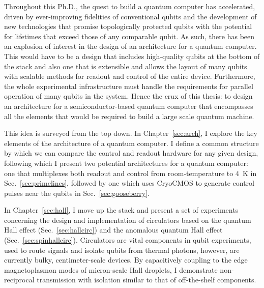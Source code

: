 %
%
%
Throughout this Ph.D., the quest to build a quantum computer has accelerated, driven by ever-improving fidelities of conventional qubits and the development of new technologies
that promise topologically protected qubits with the potential for lifetimes that exceed those of any comparable
qubit. As such, there has been an explosion of interest in the design of an architecture for a
quantum computer. This would have to be a design that includes high-quality qubits at the bottom of the stack
and also one that is extensible and allows the layout of many qubits with scalable methods for readout and
control of the entire device. Furthermore, the whole experimental infrastructure must handle the requirements for parallel operation
of many qubits in the system. Hence the crux of this thesis: to design an architecture for a semiconductor-based quantum computer that encompasses all the elements that would be required to build a large scale quantum machine.

This idea is surveyed from the top down. In Chapter~\ref{sec:arch}, I explore the key elements of the architecture of a quantum computer. I define a common structure by which we can compare the control
and readout hardware for any given design, following which I present two potential architectures for
a quantum computer: one that multiplexes both readout and control from room-temperature to \SI{4}{\kelvin} in
Sec.~\ref{sec:primelines}, followed by one which uses {CryoCMOS} to generate control pulses near the qubits
in Sec.~\ref{sec:gooseberry}.

In Chapter~\ref{sec:hall}, I move up the stack and present a set of experiments concerning the design and
implementation of circulators based on the quantum Hall effect (Sec.~\ref{sec:hallcirc}) and the
anomalous quantum Hall effect (Sec.~\ref{sec:spinhallcirc}). Circulators are vital components in qubit
experiments, used to route signals and isolate qubits from thermal photons, however, are currently bulky,
centimeter-scale devices. By capacitively coupling to the edge magnetoplasmon modes of micron-scale Hall droplets,
I demonstrate non-reciprocal transmission with isolation similar to that of off-the-shelf components.

